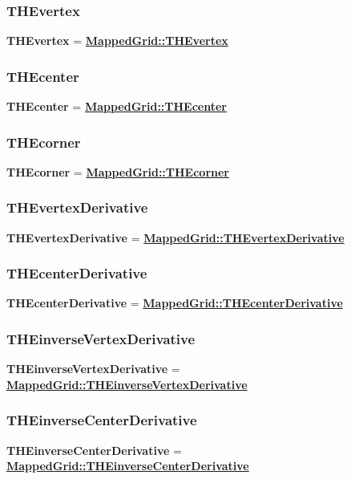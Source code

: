 \documentclass{article}
\begin{document}
  \subsubsection{THEvertex}
  \label{GridCollection::THEvertex}
    \textbf{THEvertex} = {\bf{}\hyperref{MappedGrid::THEvertex}{MappedGrid::THEvertex \rm(\S}{)}{MappedGrid::THEvertex}}

  \subsubsection{THEcenter}
  \label{GridCollection::THEcenter}
    \textbf{THEcenter} = {\bf{}\hyperref{MappedGrid::THEcenter}{MappedGrid::THEcenter \rm(\S}{)}{MappedGrid::THEcenter}}

  \subsubsection{THEcorner}
  \label{GridCollection::THEcorner}
    \textbf{THEcorner} = {\bf{}\hyperref{MappedGrid::THEcorner}{MappedGrid::THEcorner \rm(\S}{)}{MappedGrid::THEcorner}}

  \subsubsection{THEvertexDerivative}
  \label{GridCollection::THEvertexDerivative}
    \textbf{THEvertexDerivative} =
    {\bf{}\hyperref{MappedGrid::THEvertexDerivative}{MappedGrid::THEvertexDerivative \rm(\S}{)}{MappedGrid::THEvertexDerivative}}

  \subsubsection{THEcenterDerivative}
  \label{GridCollection::THEcenterDerivative}
    \textbf{THEcenterDerivative} =
    {\bf{}\hyperref{MappedGrid::THEcenterDerivative}{MappedGrid::THEcenterDerivative \rm(\S}{)}{MappedGrid::THEcenterDerivative}}

  \subsubsection{THEinverseVertexDerivative}
  \label{GridCollection::THEinverseVertexDerivative}
    \textbf{THEinverseVertexDerivative} =
    {\bf{}\hyperref{MappedGrid::THEinverseVertexDerivative}{MappedGrid::THEinverseVertexDerivative \rm(\S}{)}{MappedGrid::THEinverseVertexDerivative}}

  \subsubsection{THEinverseCenterDerivative}
  \label{GridCollection::THEinverseCenterDerivative}
    \textbf{THEinverseCenterDerivative} =
    {\bf{}\hyperref{MappedGrid::THEinverseCenterDerivative}{MappedGrid::THEinverseCenterDerivative \rm(\S}{)}{MappedGrid::THEinverseCenterDerivative}}
\end{document}
